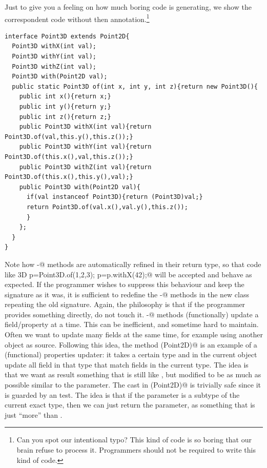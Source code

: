 Just to give you a feeling on how much boring code \mixin is generating,  we show the correspondent code without then \mixin annotation.\footnote{Can you spot our intentional typo? This kind of code is so boring that our brain refuse to process it. Programmers should not be required to write this kind of code.}
\begin{lstlisting}
interface Point3D extends Point2D{
  Point3D withX(int val);
  Point3D withY(int val);
  Point3D withZ(int val);
  Point3D with(Point2D val);
  public static Point3D of(int x, int y, int z){return new Point3D(){
    public int x(){return x;} 
    public int y(){return y;}
    public int z(){return z;}
    public Point3D withX(int val){return Point3D.of(val,this.y(),this.z());}
    public Point3D withY(int val){return Point3D.of(this.x(),val,this.z());}
    public Point3D withZ(int val){return Point3D.of(this.x(),this.y(),val);}
    public Point3D with(Point2D val){
      if(val instanceof Point3D){return (Point3D)val;}
      return Point3D.of(val.x(),val.y(),this.z());
      }
    };
  }
}
\end{lstlisting}
Note how \Q@with-@ methods are automatically refined in their return type, so that code like 
\Q@Point3D p=Point3D.of(1,2,3); p=p.withX(42);@ will be accepted and behave as expected. If the programmer wishes to suppress this behaviour and keep the signature as it was, it is sufficient to redefine the \Q@with-@ methods in the new class repeating the old signature.
Again, the philosophy is that if the programmer provides something directly, \mixin do not touch it.
\Q@with-@ methods (functionally) update a field/property at a time.
This can be inefficient, and sometime hard to maintain.
Often we want to update many fields at the same time, for example using another object as source.
Following this idea, the method \Q@with(Point2D)@ is an example of a (functional) properties updater: 
it takes a certain type and in the current object update all field in that type that match fields in the current type.
The idea is that we want as result something that is still like \Q@this@, but modified to be as much as possible similar to the parameter.
The cast in \Q@with(Point2D)@ is trivially safe since it is guarded by an \Q@instanceof@ test. The idea is that if the parameter is a subtype of the current exact type, then we can just return the parameter, as something that is just ``more'' than \Q@this@.

